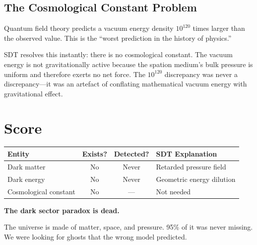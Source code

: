 \subsection{The Cosmological Constant Problem}

Quantum field theory predicts a vacuum energy density $10^{120}$ times larger than the observed value. This is the ``worst prediction in the history of physics.''

SDT resolves this instantly: there is no cosmological constant. The vacuum energy is not gravitationally active because the spation medium's bulk pressure is uniform and therefore exerts no net force. The $10^{120}$ discrepancy was never a discrepancy---it was an artefact of conflating mathematical vacuum energy with gravitational effect.


\section{Score}

\begin{center}
\begin{tabular}{lccl}
\toprule
\textbf{Entity} & \textbf{Exists?} & \textbf{Detected?} & \textbf{SDT Explanation} \\
\midrule
Dark matter & No & Never & Retarded pressure field \\
Dark energy & No & Never & Geometric energy dilution \\
Cosmological constant & No & --- & Not needed \\
\bottomrule
\end{tabular}
\end{center}

\textbf{The dark sector paradox is dead.}

The universe is made of matter, space, and pressure. 95\% of it was never missing. We were looking for ghosts that the wrong model predicted.
